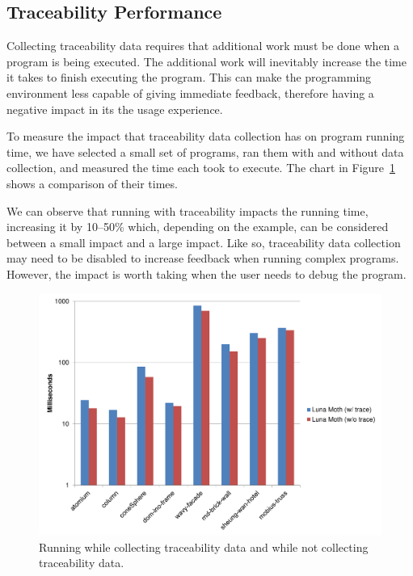 \subsection{Traceability Performance}
Collecting traceability data requires that additional work must be done when a program is being executed.
The additional work will inevitably increase the time it takes to finish executing the program.
This can make the programming environment less capable of giving immediate feedback, therefore having a negative impact in its the usage experience.

To measure the impact that traceability data collection has on program running time, we have selected a small set of programs, ran them with and without data collection, and measured the time each took to execute.
The chart in Figure~\ref{fig:traceability:timing} shows a comparison of their times.

We can observe that running with traceability impacts the running time, increasing it by 10--50\% which, depending on the example, can be considered between a small impact and a large impact.
Like so, traceability data collection may need to be disabled to increase feedback when running complex programs.
However, the impact is worth taking when the user needs to debug the program.

\begin{figure}
  \centering
  \includegraphics[width=1.0\textwidth]{./images/traceability_timing}
  \caption{Running while collecting traceability data and while not collecting traceability data.}
  \label{fig:traceability:timing}
\end{figure}





